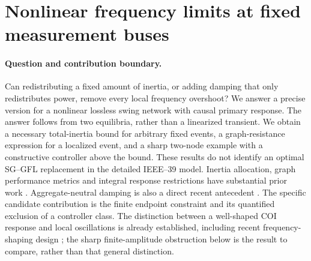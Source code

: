 \section{Nonlinear frequency limits at fixed measurement buses}
\label{sec:nonlinear-fixed-bus}

\paragraph{Question and contribution boundary.}
Can redistributing a fixed amount of inertia, or adding damping that only
redistributes power, remove every local frequency overshoot? We answer a
precise version for a nonlinear lossless swing network with causal primary
response. The answer follows from two equilibria, rather than a linearized
transient. We obtain a necessary total-inertia bound for arbitrary fixed
events, a graph-resistance expression for a localized event, and a sharp
two-node example with a constructive controller above the bound.
These results do not identify an optimal SG--GFL replacement in the detailed
IEEE--39 model. Inertia allocation, graph performance metrics and integral
response restrictions have substantial prior work
\cite{poollainertia,pagnier,malladamoments,aalipourmoments}.
Aggregate-neutral damping is also a direct recent antecedent
\cite{kohlhaas2026}. The specific candidate contribution is the finite
endpoint constraint and its quantified exclusion of a controller class.
The distinction between a well-shaped COI response and local oscillations
is already established, including recent frequency-shaping design
\cite{jiangfs}; the sharp finite-amplitude obstruction below is the result
to compare, rather than that general distinction.

